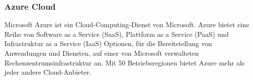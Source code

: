 \subsubsection{Azure Cloud}

Microsoft Azure ist ein Cloud-Computing-Dienst von Microsoft. Azure bietet eine Reihe von Software as a Service (SaaS), Plattform as a Service (PaaS) und Infrastruktur as a Service (IaaS) Optionen, für die Bereitstellung von Anwendungen und Diensten, auf einer von Microsoft verwalteten Rechenzentrumsinfrastruktur an. Mit 50 Betriebsregionen bietet Azure mehr als jeder andere Cloud-Anbieter.

